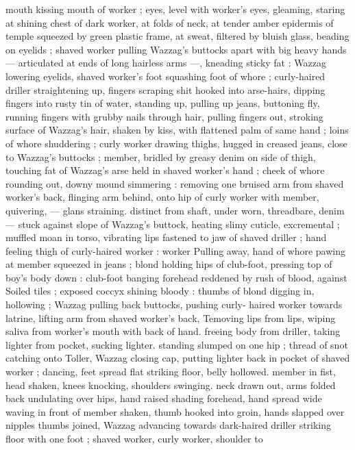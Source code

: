 mouth kissing mouth of worker ; eyes, level with worker's eyes,
gleaming, staring at shining chest of dark worker, at folds of neck, at
tender amber epidermis of temple squeezed by green plastic frame,
at sweat, filtered by bluish glass, beading on eyelids ; shaved worker
pulling Wazzag's buttocks apart with big heavy hands --- articulated
at ends of long hairless arms ---, kneading sticky fat : Wazzag
lowering eyelids, shaved worker's foot squashing foot of whore ;
curly-haired driller straightening up, fingers scraping shit hooked
into arse-hairs, dipping fingers into rusty tin of water, standing up,
pulling up jeans, buttoning fly, running fingers with grubby nails
through hair, pulling fingers out, stroking surface of Wazzag's hair,
shaken by kiss, with flattened palm of same hand ; loins of whore
shuddering ; curly worker drawing thighs, hugged in creased jeans,
close to Wazzag's buttocks ; member, bridled by greasy denim on
side of thigh, touching fat of Wazzag’s arse held in shaved worker's
hand ; cheek of whore rounding out, downy mound simmering :
removing one bruised arm from shaved worker's back, flinging arm
behind, onto hip of curly worker with member, quivering, --- glans
straining. distinct from shaft, under worn, threadbare, denim ---
stuck against slope of Wazzag's buttock, heating slimy cuticle,
excremental ; muffled moan in torso, vibrating lips fastened to jaw of
shaved driller ; hand feeling thigh of curly-haired worker : worker
Pulling away, hand of whore pawing at member squeezed in jeans ;
blond holding hips of club-foot, pressing top of boy's body down :
club-foot banging forehead reddened by rush of blood, against
Soiled tiles ; exposed coccyx shining bloody : thumbs of blond
digging in, hollowing ; Wazzag pulling back buttocks, pushing curly-
haired worker towards latrine, lifting arm from shaved worker's back,
Temoving lips from lips, wiping saliva from worker's mouth with back
of hand. freeing body from driller, taking lighter from pocket, sucking
lighter. standing slumped on one hip ; thread of snot catching onto
Toller, Wazzag closing cap, putting lighter back in pocket of shaved
worker ; dancing, feet spread flat striking floor, belly hollowed.
member in fist, head shaken, knees knocking, shoulders swinging.
neck drawn out, arms folded back undulating over hips, hand raised
shading forehead, hand spread wide waving in front of member
shaken, thumb hooked into groin, hands slapped over nipples
thumbs joined, Wazzag advancing towards dark-haired driller striking
floor with one foot ; shaved worker, curly worker, shoulder to
